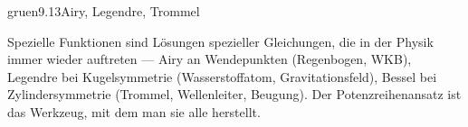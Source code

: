 \begin{loesungkarte}{gruen}{9.13}{Airy, Legendre, Trommel}
\begin{mitnehmen}\kastentext
Spezielle Funktionen sind Lösungen spezieller Gleichungen, die in der Physik immer wieder auftreten --- Airy an Wendepunkten (Regenbogen, WKB), Legendre bei Kugelsymmetrie (Wasserstoffatom, Gravitationsfeld), Bessel bei Zylindersymmetrie (Trommel, Wellenleiter, Beugung). Der Potenzreihenansatz ist das Werkzeug, mit dem man sie alle herstellt.
\end{mitnehmen}
\end{loesungkarte}

